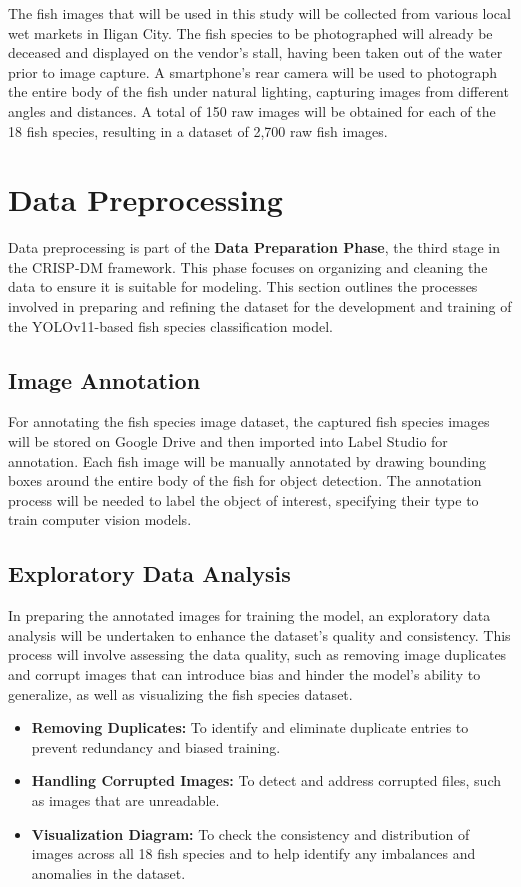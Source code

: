 \noindent The fish images that will be used in this study will be collected from various local wet markets in Iligan City. The fish species to be photographed will already be deceased and displayed on the vendor's stall, having been taken out of the water prior to image capture. A smartphone's rear camera will be used to photograph the entire body of the fish under natural lighting, capturing images from different angles and distances. A total of 150 raw images will be obtained for each of the 18 fish species, resulting in a dataset of 2,700 raw fish images.


\section{Data Preprocessing}
Data preprocessing is part of the \textbf{Data Preparation Phase}, the third stage in the CRISP-DM framework. This phase focuses on organizing and cleaning the data to ensure it is suitable for modeling. This section outlines the processes involved in preparing and refining the dataset for the development and training of the YOLOv11-based fish species classification model.

\subsection{Image Annotation}
For annotating the fish species image dataset, the captured fish species images will be stored on Google Drive and then imported into Label Studio for annotation. Each fish image will be manually annotated by drawing bounding boxes around the entire body of the fish for object detection. The annotation process will be needed to label the object of interest, specifying their type to train computer vision models. 

\subsection{Exploratory Data Analysis}
In preparing the annotated images for training the model, an exploratory data analysis will be undertaken to enhance the dataset's quality and consistency. This process will involve assessing the data quality, such as removing image duplicates and corrupt images that can introduce bias and hinder the model's ability to generalize, as well as visualizing the fish species dataset.

\begin{itemize}
  \item \textbf{Removing Duplicates:} To identify and eliminate duplicate entries to prevent redundancy and biased training.
  \item \textbf{Handling Corrupted Images:} To detect and address corrupted files, such as images that are unreadable.
  \item \textbf{Visualization Diagram:} To check the consistency and distribution of images across all 18 fish species and to help identify any imbalances and anomalies in the dataset.
\end{itemize}



